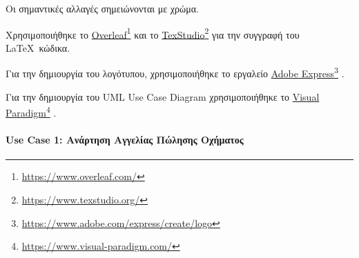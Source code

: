 \documentclass{../ol-softwaremanual}
\newcommand{\doclink}[2]{\href{#1}{#2}\footnote{\url{#1}}}
\begin{document}
	
	\vspace{20pt}
	
	Οι σημαντικές αλλαγές σημειώνονται με  χρώμα.
	
	
	
	
	\newpage 
	
	\vspace{20pt}
	\flushleft
	Χρησιμοποιήθηκε το \en \doclink{https://www.overleaf.com/}{Overleaf} \gr και το \en \doclink{https://www.texstudio.org/}{TexStudio} \gr για την συγγραφή του \LaTeX\ κώδικα. \break
	
	Για την δημιουργία του λογότυπου, χρησιμοποιήθηκε το εργαλείο \en \doclink{https://www.adobe.com/express/create/logo}{Adobe Express} . \gr \break
	
	Για την δημιουργία του \en UML Use Case Diagram \gr χρησιμοποιήθηκε το \en \doclink{https://www.visual-paradigm.com/}{Visual Paradigm} . \gr \break 
	
	\newpage
	
	
	\paragraph{\en Use Case 1: \gr Ανάρτηση Αγγελίας Πώλησης Οχήματος}
	
\end{document}
